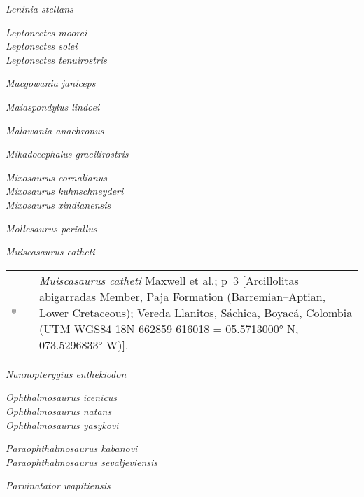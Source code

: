 \documentclass[notuftebib,font=erewhon]{tufte-lualatex}
\newenvironment*{synonymy}%
	{
		\footnotesize
		\begin{tabu}[l]{rlX}
	}%
	{
		\\
		\end{tabu}
		\normalsize
	}
\begin{document}
\emph{Leninia stellans} \cite*[Fischer et al.,][]{Fischer2014GM}

\emph{Leptonectes moorei} \cite*[McGowan \& Milner,][]{McGowan1999P}\\
\emph{Leptonectes solei} \parencite*[McGowan,][]{McGowan1993CJES}\\
\emph{Leptonectes tenuirostris} \parencite*[Conybeare,][]{Conybeare1822TGSL}

\emph{Macgowania janiceps} \parencite*[McGowan,][]{McGowan1996CJES}

\emph{Maiaspondylus lindoei} \cite*[Maxwell \& Caldwell,][]{Maxwell2006P}

\emph{Malawania anachronus} \cite*[Fischer et al.,][]{Fischer2013BL}

\emph{Mikadocephalus gracilirostris} \cite*[Maisch \& Matzke,][]{Maisch1997PZ}

\emph{Mixosaurus cornalianus} \parencite*[Bassani,][]{Bassani1886ASISN}\\
\emph{Mixosaurus kuhnschneyderi} \parencite*[Brinkmann,][]{Brinkmann1998NJGPA}\\
\emph{Mixosaurus xindianensis} \cite*[Chen \& Cheng,][]{Chen2010APS}

\emph{Mollesaurus periallus} \cite*[Fernández,][]{Fernandez1999JP}

\emph{Muiscasaurus catheti} \cite*[Maxwell et al.,][]{Maxwell2016PP}\\
\begin{synonymy}
	*	& \cite*{Maxwell2016PP}	& \emph{Muiscasaurus catheti} Maxwell et al.; p~3 [Arcillolitas abigarradas Member, Paja Formation (Barremian–Aptian, Lower Cretaceous); Vereda Llanitos, Sáchica, Boyacá, Colombia (UTM WGS84 18N 662859 616018 = 05.5713000° N, 073.5296833° W)].
\end{synonymy}

\emph{Nannopterygius enthekiodon} \parencite*[Hulke,][]{Hulke1871QJGS}

\emph{Ophthalmosaurus icenicus} \cite*[Seeley,][]{Seeley1874QJGSa}\\
\emph{Ophthalmosaurus natans} \parencite*[Marsh,][]{Marsh1879AMNH}\\
\emph{Ophthalmosaurus yasykovi} \parencite*[Efimov,][]{Efimov1999PZ}

\emph{Paraophthalmosaurus kabanovi} \parencite*[Efimov,][]{Efimov1999PZ}\\
\emph{Paraophthalmosaurus sevaljeviensis}
    \cite*[Arkhangelsky,][]{Arkhangelsky1997PZ}

\emph{Parvinatator wapitiensis}
    \cite*[Nicholls \& Brinkman,][]{Nicholls1995Vfateosc}
\end{document}
